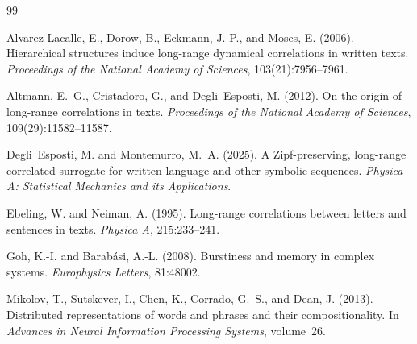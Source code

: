 \documentclass[preprint]{elsarticle}
\newcommand{\TODO}[1]{\textcolor{red}{\textbf{[TODO: #1]}}}
\newcommand{\NOTE}[1]{\textcolor{blue}{\textbf{[NOTE: #1]}}}
\begin{document}
%


%

\begin{thebibliography}{99}

Alvarez-Lacalle, E., Dorow, B., Eckmann, J.-P., and Moses, E. (2006).
\newblock Hierarchical structures induce long-range dynamical correlations in written texts.
\newblock \emph{Proceedings of the National Academy of Sciences},
  103(21):7956--7961.

Altmann, E.~G., Cristadoro, G., and Degli~Esposti, M. (2012).
\newblock On the origin of long-range correlations in texts.
\newblock \emph{Proceedings of the National Academy of Sciences},
  109(29):11582--11587.

Degli~Esposti, M. and Montemurro, M.~A. (2025).
\newblock A {Z}ipf-preserving, long-range correlated surrogate for
  written language and other symbolic sequences.
\newblock \emph{Physica A: Statistical Mechanics and its Applications}.

Ebeling, W. and Neiman, A. (1995).
\newblock Long-range correlations between letters and sentences in
  texts.
\newblock \emph{Physica A}, 215:233--241.

Goh, K.-I. and Barab{\'a}si, A.-L. (2008).
\newblock Burstiness and memory in complex systems.
\newblock \emph{Europhysics Letters}, 81:48002.

Mikolov, T., Sutskever, I., Chen, K., Corrado, G.~S., and Dean, J.
  (2013).
\newblock Distributed representations of words and phrases and their
  compositionality.
\newblock In \emph{Advances in Neural Information Processing Systems},
  volume~26.


\end{thebibliography}
\end{document}
